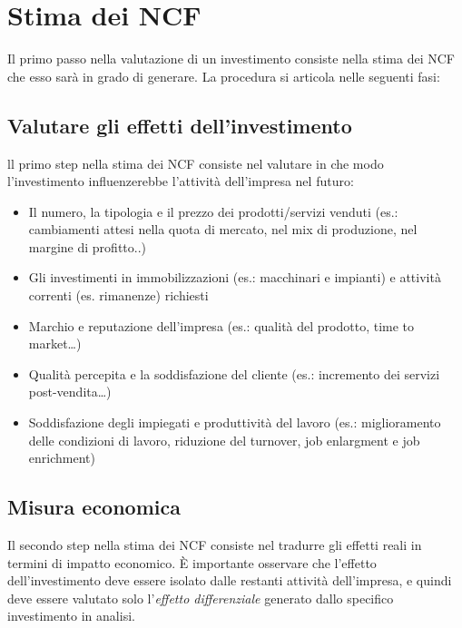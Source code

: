 \section{Stima dei NCF}
Il primo passo nella valutazione di un investimento consiste nella stima dei \gls{NCF} che
esso sarà in grado di generare. La procedura si articola nelle seguenti fasi:

\subsection{Valutare gli effetti dell’investimento}
ll primo step nella stima dei NCF consiste nel valutare in che modo 
l’investimento influenzerebbe l’attività dell’impresa nel futuro:
\begin{itemize}
    \item Il numero, la tipologia e il prezzo dei prodotti/servizi venduti (es.: 
    cambiamenti attesi nella quota di mercato, nel mix di produzione, nel 
    margine di profitto..)
    \item Gli investimenti in immobilizzazioni (es.: macchinari e impianti) e attività 
    correnti (es. rimanenze) richiesti
    \item Marchio e reputazione dell’impresa (es.: qualità del prodotto, time to 
    market…)
    \item Qualità percepita e la soddisfazione del cliente (es.: incremento dei servizi 
    post-vendita…)
    \item Soddisfazione degli impiegati e produttività del lavoro (es.: miglioramento 
    delle condizioni di lavoro, riduzione del turnover, job enlargment e job 
    enrichment)
\end{itemize}

\subsection{Misura economica}
Il secondo step nella stima dei NCF consiste nel tradurre gli effetti reali in termini di impatto
economico. È importante osservare che l’effetto dell’investimento deve essere isolato dalle restanti attività
dell’impresa, e quindi deve essere valutato solo l’\emph{effetto differenziale} generato dallo specifico investimento in
analisi.

